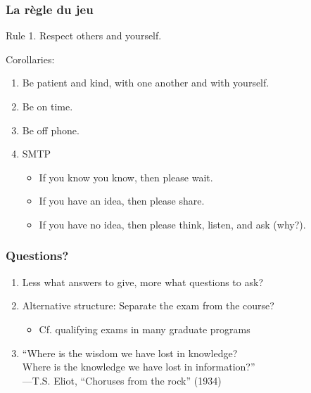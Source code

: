 \documentclass[blue]{beamer}
\begin{document}
\begin{frame}
\frametitle{La r\`{e}gle du jeu}

Rule 1. Respect others and yourself.

\vspace{0.25in}

Corollaries:

\begin{enumerate}
    \item Be patient and kind, with one another and with yourself.
    \item Be on time.
    \item Be off phone.
    \item SMTP
    \begin{itemize}
        \item If you know you know, then please wait.
        \item If you have an idea, then please share.
        \item If you have no idea, then please think, listen, and ask (why?).
    \end{itemize}
\end{enumerate}
\end{frame}



\begin{frame}
\frametitle{Questions?}

\begin{enumerate}
    \item Less what answers to give, more what questions to ask?
    \item Alternative structure: Separate the exam from the course?
    \begin{itemize}
        \item Cf. qualifying exams in many graduate programs
    \end{itemize}
    \item ``Where is the wisdom we have lost in knowledge?\\
    Where is the knowledge we have lost in information?''\\
    ---T.S. Eliot, ``Choruses from the rock'' (1934)
\end{enumerate}
\end{frame}
\end{document}

